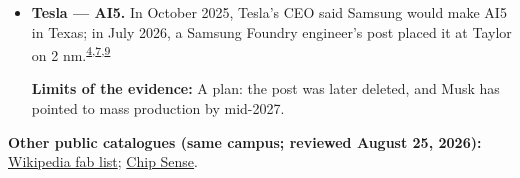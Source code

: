\begin{minipage}[t][0.90\textheight][t]{\textwidth}
\begin{itemize}[leftmargin=1.25em,itemsep=0.35em,topsep=0.15em,parsep=0pt]
\item {\footnotesize\textbf{Tesla --- AI5.} In October 2025, Tesla's CEO said Samsung would make AI5 in Texas; in July 2026, a Samsung Foundry engineer's post placed it at Taylor on 2 nm.\nobreak\textsuperscript{\href{\detokenize{https://irsvc.teletogether.com/sec/pdf/2026Q2_script_eng.pdf?1=}}{\textcolor{accent}{4}},\href{\detokenize{https://electrek.co/2026/07/13/samsung-taylor-fab-tesla-ai5-chip-2nm/}}{\textcolor{accent}{7}},\href{\detokenize{https://www.cnbc.com/2025/10/22/elon-musk-tesla-ai5-nvidia.html}}{\textcolor{accent}{9}}}\par {\scriptsize\color{black!62}\textbf{Limits of the evidence:} A plan: the post was later deleted, and Musk has pointed to mass production by mid-2027.\par}}
\end{itemize}
\smallskip
{\sffamily\scriptsize\color{black!62}\textbf{Other public catalogues (same campus; reviewed August 25, 2026):} \href{\detokenize{https://en.wikipedia.org/w/index.php?title=List_of_semiconductor_fabrication_plants&oldid=1370451124}\#\detokenize{Open_plants}}{Wikipedia fab list}; \href{\detokenize{https://github.com/aminalav/chip-sense/blob/93d22afe9e1309a7bebd6c7c96541f069f1d67ac/src/data/fab-sites.json}\#\detokenize{L43-L50}}{Chip Sense}.\par}
\medskip

\end{minipage}
